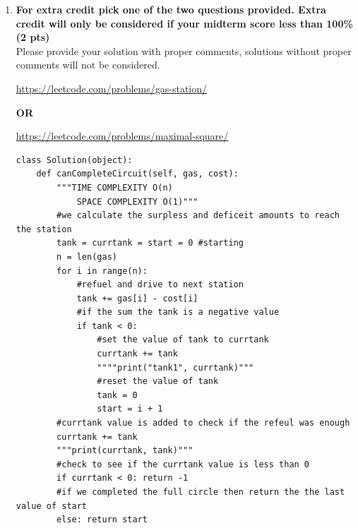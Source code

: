 \documentclass[12pt]{article}
\begin{document}
\begin{enumerate}
    
    \item{\textbf{For extra credit pick one of the two questions provided. Extra credit will only be considered if your midterm score less than 100\% (2 pts)} \\ 
    

    Please provide your solution with proper comments, solutions without proper comments will not be considered.}
    
   \url{ https://leetcode.com/problems/gas-station/ }
   



\begin{center}
    \textbf{OR}
\end{center}   

 
  
    
   \url{  https://leetcode.com/problems/maximal-square/ }


\begin{verbatim}
class Solution(object):
    def canCompleteCircuit(self, gas, cost):
        """TIME COMPLEXITY O(n)
            SPACE COMPLEXITY O(1)"""
        #we calculate the surpless and deficeit amounts to reach the station
        tank = currtank = start = 0 #starting 
        n = len(gas)
        for i in range(n):
            #refuel and drive to next station
            tank += gas[i] - cost[i]
            #if the sum the tank is a negative value
            if tank < 0:
                #set the value of tank to currtank
                currtank += tank
                """"print("tank1", currtank)"""
                #reset the value of tank
                tank = 0
                start = i + 1
        #currtank value is added to check if the refeul was enough
        currtank += tank
        """print(currtank, tank)"""
        #check to see if the currtank value is less than 0
        if currtank < 0: return -1
        #if we completed the full circle then return the the last value of start 
        else: return start
\end{verbatim}	
    
	
\end{enumerate}
\end{document}
